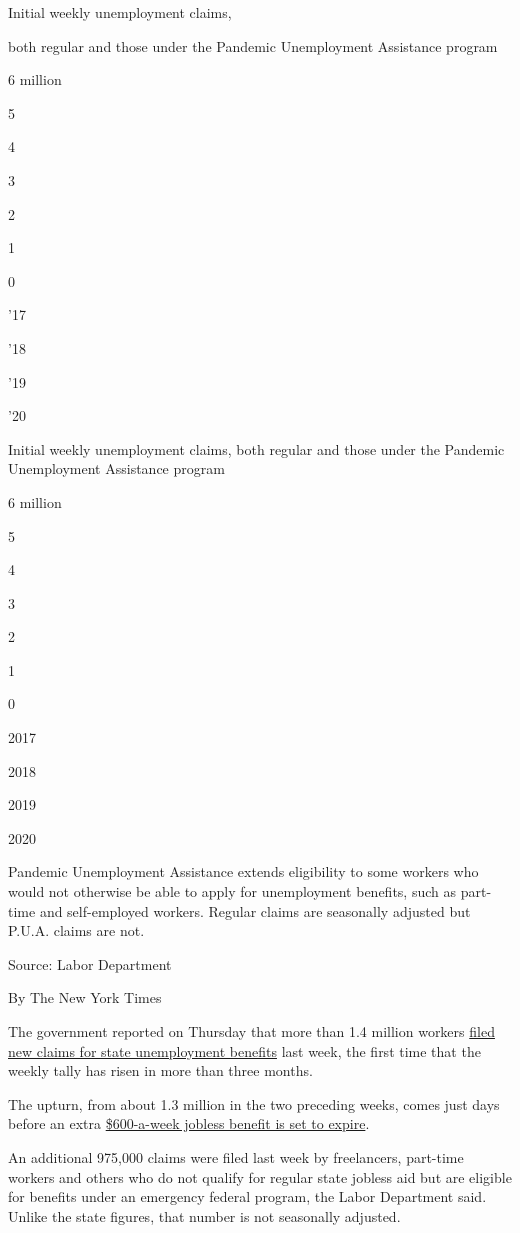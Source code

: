 Initial weekly unemployment claims,

both regular and those under the Pandemic Unemployment Assistance
program

6 million

5

4

3

2

1

0

'17

'18

'19

'20

Initial weekly unemployment claims, both regular and those under the
Pandemic Unemployment Assistance program

6 million

5

4

3

2

1

0

2017

2018

2019

2020

Pandemic Unemployment Assistance extends eligibility to some workers who
would not otherwise be able to apply for unemployment benefits, such as
part-time and self-employed workers. Regular claims are seasonally
adjusted but P.U.A. claims are not.

Source: Labor Department

By The New York Times

The government reported on Thursday that more than 1.4 million workers
\href{https://www.dol.gov/ui/data.pdf}{filed new claims for state
unemployment benefits} last week, the first time that the weekly tally
has risen in more than three months.

The upturn, from about 1.3 million in the two preceding weeks, comes
just days before an extra
\href{https://www.nytimes.com/2020/07/21/business/economy/coronavirus-unemployment-benefits.html}{\$600-a-week
jobless benefit is set to expire}.

An additional 975,000 claims were filed last week by freelancers,
part-time workers and others who do not qualify for regular state
jobless aid but are eligible for benefits under an emergency federal
program, the Labor Department said. Unlike the state figures, that
number is not seasonally adjusted.

